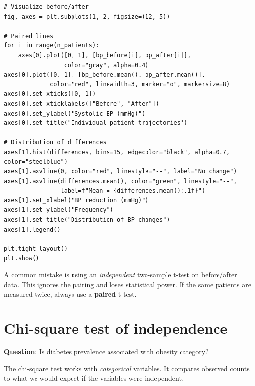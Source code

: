 \begin{verbatim}
# Visualize before/after
fig, axes = plt.subplots(1, 2, figsize=(12, 5))

# Paired lines
for i in range(n_patients):
    axes[0].plot([0, 1], [bp_before[i], bp_after[i]],
                 color="gray", alpha=0.4)
axes[0].plot([0, 1], [bp_before.mean(), bp_after.mean()],
             color="red", linewidth=3, marker="o", markersize=8)
axes[0].set_xticks([0, 1])
axes[0].set_xticklabels(["Before", "After"])
axes[0].set_ylabel("Systolic BP (mmHg)")
axes[0].set_title("Individual patient trajectories")

# Distribution of differences
axes[1].hist(differences, bins=15, edgecolor="black", alpha=0.7, color="steelblue")
axes[1].axvline(0, color="red", linestyle="--", label="No change")
axes[1].axvline(differences.mean(), color="green", linestyle="--",
                label=f"Mean = {differences.mean():.1f}")
axes[1].set_xlabel("BP reduction (mmHg)")
axes[1].set_ylabel("Frequency")
axes[1].set_title("Distribution of BP changes")
axes[1].legend()

plt.tight_layout()
plt.show()
\end{verbatim}

\begin{warningbox}
A common mistake is using an \emph{independent} two-sample t-test on before/after data. This ignores the pairing and loses statistical power. If the same patients are measured twice, always use a \textbf{paired} t-test.
\end{warningbox}

\section{Chi-square test of independence}

\textbf{Question:} Is diabetes prevalence associated with obesity category?

The chi-square test works with \emph{categorical} variables. It compares observed counts to what we would expect if the variables were independent.

